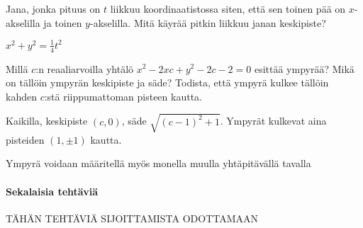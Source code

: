 \begin{tehtavasivu}
\begin{tehtava}
	Jana, jonka pituus on $t$ liikkuu koordinaatistossa siten, että sen toinen pää on $x$-akselilla ja toinen $y$-akselilla. Mitä käyrää pitkin liikkuu janan keskipiste?
	\begin{vastaus}
		$x^2+y^2=\frac{1}{4}t^2$
	\end{vastaus}
\end{tehtava}

\begin{tehtava}
	Millä $c$:n reaaliarvoilla yhtälö $x^2-2xc+y^2-2c-2 = 0$ esittää ympyrää? Mikä on tällöin ympyrän keskipiste ja säde? Todista, että ympyrä kulkee tällöin kahden $c$:stä riippumattoman pisteen kautta.
	\begin{vastaus}
		Kaikilla, keskipiste $(c,0)$, säde $\sqrt{(c-1)^2+1}$. Ympyrät kulkevat aina pisteiden $(1,\pm 1)$ kautta.
	\end{vastaus}
\end{tehtava}

\begin{tehtava}
	Ympyrä voidaan määritellä myös monella muulla yhtäpitävällä tavalla
	\begin{vastaus}
	\end{vastaus}
\end{tehtava}

\paragraph*{Sekalaisia tehtäviä}

TÄHÄN TEHTÄVIÄ SIJOITTAMISTA ODOTTAMAAN

\end{tehtavasivu}
